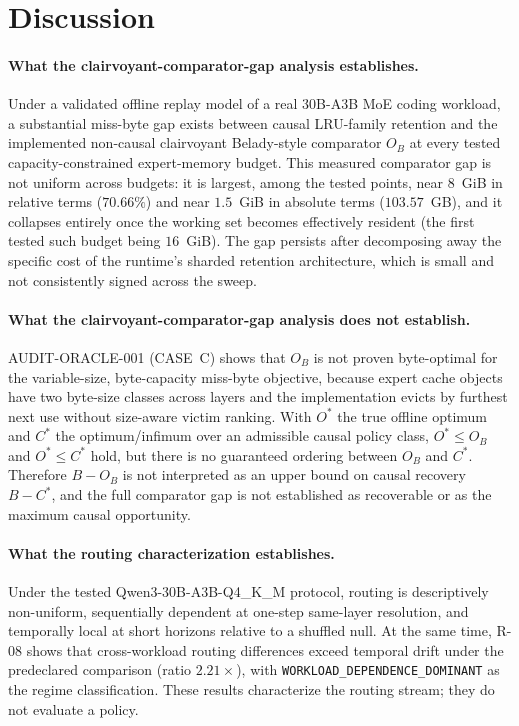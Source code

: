 \section{Discussion}
\label{sec:discussion}

\paragraph{What the clairvoyant-comparator-gap analysis establishes.} Under a validated offline replay
model of a real 30B-A3B MoE coding workload, a substantial miss-byte gap
exists between causal LRU-family retention and the implemented
non-causal clairvoyant Belady-style comparator $O_B$ at every tested
capacity-constrained expert-memory budget. This measured comparator gap is
not uniform across budgets: it is largest, among the tested points, near
$8$~GiB in relative terms ($70.66\%$) and near $1.5$~GiB in absolute
terms ($103.57$~GB), and it collapses entirely once the working set
becomes effectively resident (the first tested such budget being
$16$~GiB). The gap persists after decomposing away the specific cost of
the runtime's sharded retention architecture, which is small and not
consistently signed across the sweep.

\paragraph{What the clairvoyant-comparator-gap analysis does not establish.} \textsc{AUDIT-ORACLE-001}
(CASE~C) shows that $O_B$ is not proven byte-optimal for the
variable-size, byte-capacity miss-byte objective, because expert cache
objects have two byte-size classes across layers and the implementation
evicts by furthest next use without size-aware victim ranking. With
$O^*$ the true offline optimum and $C^*$ the optimum/infimum over an
admissible causal policy class, $O^* \le O_B$ and $O^* \le C^*$ hold, but
there is no guaranteed ordering between $O_B$ and $C^*$. Therefore
$B-O_B$ is not interpreted as an upper bound on causal recovery $B-C^*$,
and the full comparator gap is not established as recoverable or as the
maximum causal opportunity.

\paragraph{What the routing characterization establishes.} Under the tested
Qwen3-30B-A3B-Q4\_K\_M protocol, routing is descriptively non-uniform,
sequentially dependent at one-step same-layer resolution, and temporally
local at short horizons relative to a shuffled null. At the same time,
R-08 shows that cross-workload routing differences exceed temporal drift
under the predeclared comparison (ratio $2.21\times$), with
\texttt{WORKLOAD\_DEPENDENCE\_DOMINANT} as the regime classification.
These results characterize the routing stream; they do not evaluate a
policy.

